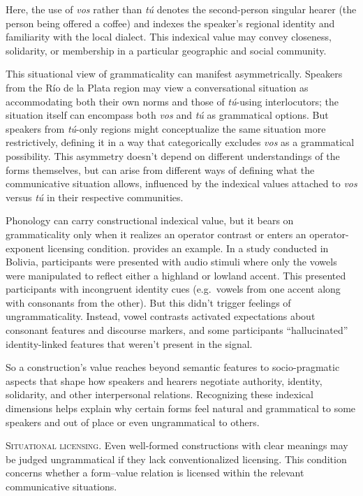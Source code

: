 \documentclass[12pt,letterpaper]{article}
\newcommand{\olang}[1]{\textit{#1}}
\begin{document}
Here, the use of \olang{vos} rather than \olang{tú} denotes the second-person singular hearer (the person being offered a coffee) and indexes the speaker's regional identity and familiarity with the local dialect. This indexical value may convey closeness, solidarity, or membership in a particular geographic and social community.

This situational view of grammaticality can manifest asymmetrically. Speakers from the Río de la Plata region may view a conversational situation as accommodating both their own norms and those of \olang{tú}-using interlocutors; the situation itself can encompass both \olang{vos} and \olang{tú} as grammatical options. But speakers from \olang{tú}-only regions might conceptualize the same situation more restrictively, defining it in a way that categorically excludes \olang{vos} as a grammatical possibility. This asymmetry doesn't depend on different understandings of the forms themselves, but can arise from different ways of defining what the communicative situation allows, influenced by the indexical values attached to \olang{vos} versus \olang{tú} in their respective communities.

Phonology can carry constructional indexical value, but it bears on grammaticality only when it realizes an operator contrast or enters an operator-exponent licensing condition. \textcite{Babel2025} provides an example. In a study conducted in Bolivia, participants were presented with audio stimuli where only the vowels were manipulated to reflect either a highland or lowland accent. This presented participants with incongruent identity cues (e.g.\, vowels from one accent along with consonants from the other). But this didn't trigger feelings of ungrammaticality. Instead, vowel contrasts activated expectations about consonant features and discourse markers, and some participants \enquote{hallucinated} identity-linked features that weren't present in the signal.

So a construction's value reaches beyond semantic features to socio-pragmatic aspects that shape how speakers and hearers negotiate authority, identity, solidarity, and other interpersonal relations. Recognizing these indexical dimensions helps explain why certain forms feel natural and grammatical to some speakers and out of place or even ungrammatical to others.

\noindent\textsc{Situational licensing.} Even well-formed constructions with clear meanings may be judged ungrammatical if they lack conventionalized licensing. This condition concerns whether a form--value relation is licensed within the relevant communicative situations.
\end{document}
